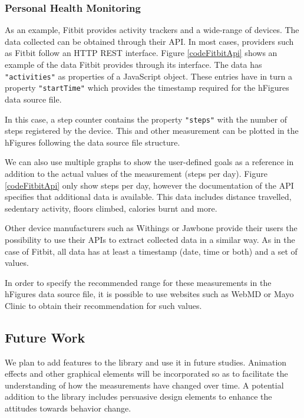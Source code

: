 \documentclass[twocolumn]{bmcart}%
\begin{document}
\subsubsection*{Personal Health Monitoring}

As an example, Fitbit provides activity trackers and a wide-range of devices. The data collected can be obtained through their API. In most cases, providers such as Fitbit follow an HTTP REST interface. Figure \ref{codeFitbitApi} shows an example of the data Fitbit provides through its interface. The data has \texttt{"activities"} as properties of a JavaScript object. These entries have in turn a property \texttt{"startTime"} which provides the timestamp required for the hFigures data source file.

In this case, a step counter contains the property \texttt{"steps"} with the number of steps registered by the device. This and other measurement can be plotted in the hFigures following the data source file structure.

We can also use multiple graphs to show the user-defined goals as a reference in addition to the actual values of the measurement (steps per day). Figure \ref{codeFitbitApi} only show steps per day, however the documentation of the API specifies that additional data is available. This data includes distance travelled, sedentary activity, floors climbed, calories burnt and more.

Other device manufacturers such as Withings or Jawbone provide their users the possibility to use their APIs to extract collected data in a similar way. As in the case of Fitbit, all data has at least a timestamp (date, time or both) and a set of values.

In order to specify the recommended range for these measurements in the hFigures data source file, it is possible to use websites such as WebMD or Mayo Clinic to obtain their recommendation for such values.

\subsection*{Future Work}

We plan to add features to the library and use it in future studies. Animation effects and other graphical elements will be incorporated so as to facilitate the understanding of how the measurements have changed over time. A potential addition to the library includes persuasive design elements to enhance the attitudes towards behavior change.
\end{document}
